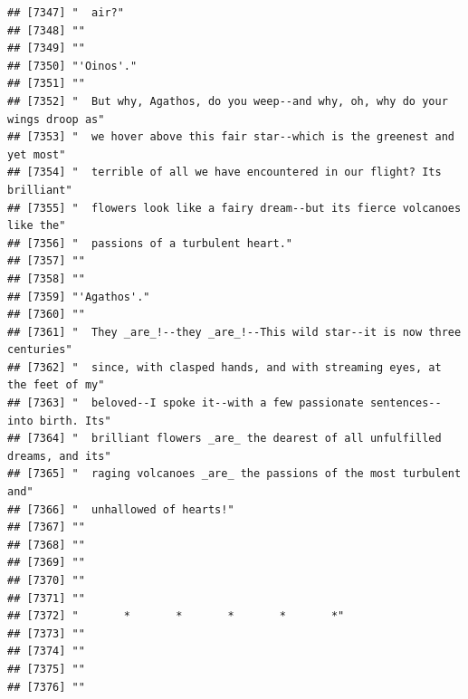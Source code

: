 \documentclass{article}\usepackage[]{graphicx}\usepackage[]{color}
\makeatletter
\newenvironment{kframe}{%
 \def\at@end@of@kframe{}%
 \ifinner\ifhmode%
  \def\at@end@of@kframe{\end{minipage}}%
  \begin{minipage}{\columnwidth}%
 \fi\fi%
 \def\FrameCommand##1{\hskip\@totalleftmargin \hskip-\fboxsep
 \colorbox{shadecolor}{##1}\hskip-\fboxsep
     \hskip-\linewidth \hskip-\@totalleftmargin \hskip\columnwidth}%
 \MakeFramed {\advance\hsize-\width
   \@totalleftmargin\z@ \linewidth\hsize
   \@setminipage}}%
 {\par\unskip\endMakeFramed%
 \at@end@of@kframe}
\newenvironment{knitrout}{}{} %
\makeatother
\begin{document}
\begin{knitrout}
\begin{kframe}
\begin{verbatim}
## [7347] "  air?"                                                                      
## [7348] ""                                                                            
## [7349] ""                                                                            
## [7350] "'Oinos'."                                                                    
## [7351] ""                                                                            
## [7352] "  But why, Agathos, do you weep--and why, oh, why do your wings droop as"    
## [7353] "  we hover above this fair star--which is the greenest and yet most"         
## [7354] "  terrible of all we have encountered in our flight? Its brilliant"          
## [7355] "  flowers look like a fairy dream--but its fierce volcanoes like the"        
## [7356] "  passions of a turbulent heart."                                            
## [7357] ""                                                                            
## [7358] ""                                                                            
## [7359] "'Agathos'."                                                                  
## [7360] ""                                                                            
## [7361] "  They _are_!--they _are_!--This wild star--it is now three centuries"       
## [7362] "  since, with clasped hands, and with streaming eyes, at the feet of my"     
## [7363] "  beloved--I spoke it--with a few passionate sentences--into birth. Its"     
## [7364] "  brilliant flowers _are_ the dearest of all unfulfilled dreams, and its"    
## [7365] "  raging volcanoes _are_ the passions of the most turbulent and"             
## [7366] "  unhallowed of hearts!"                                                     
## [7367] ""                                                                            
## [7368] ""                                                                            
## [7369] ""                                                                            
## [7370] ""                                                                            
## [7371] ""                                                                            
## [7372] "       *       *       *       *       *"                                    
## [7373] ""                                                                            
## [7374] ""                                                                            
## [7375] ""                                                                            
## [7376] ""                                                                            

\end{verbatim}
\end{kframe}
\end{knitrout}
\end{document}
